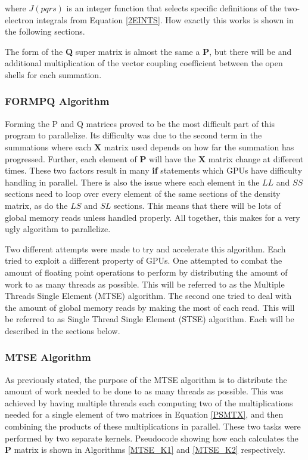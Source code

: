where $J(pqrs)$ is an integer function that selects specific definitions of the two-electron integrals from Equation \ref{2EINTS}. How exactly this works is shown in the following sections.

The form of the \textbf{Q} super matrix is almost the same a \textbf{P}, but there will be and additional multiplication of the vector coupling coefficient between the open shells for each summation.

\subsubsection{FORMPQ Algorithm}
Forming the P and Q matrices proved to be the most difficult part of this program to parallelize. Its difficulty was due to the second term in the summations where each \textbf{X} matrix used depends on how far the summation has progressed. Further, each element of \textbf{P} will have the \textbf{X} matrix change at different times. These two factors result in many \textbf{if} statements which GPUs have difficulty handling in parallel. There is also the issue where each element in the $LL$ and $SS$ sections need to loop over every element of the same sections of the density matrix, as do the $LS$ and $SL$ sections. This means that there will be lots of global memory reads unless handled properly. All together, this makes for a very ugly algorithm to parallelize.

Two different attempts were made to try and accelerate this algorithm. Each tried to exploit a different property of GPUs. One attempted to combat the amount of floating point operations to perform by distributing the amount of work to as many threads as possible. This will be referred to as the Multiple Threads Single Element (MTSE) algorithm. The second one tried to deal with the amount of global memory reads by making the most of each read. This will be referred to as Single Thread Single Element (STSE) algorithm. Each will be described in the sections below.

\subsubsection{MTSE Algorithm}
As previously stated, the purpose of the MTSE algorithm is to distribute the amount of work needed to be done to as many threads as possible. This was achieved by having multiple threads each computing two of the multiplications needed for a single element of two matrices in Equation \ref{PSMTX}, and then combining the products of these multiplications in parallel. These two tasks were performed by two separate kernels. Pseudocode showing how each calculates the \textbf{P} matrix is shown in Algorithms \ref{MTSE_K1} and \ref{MTSE_K2} respectively. 

